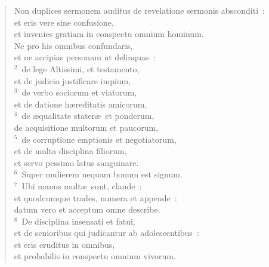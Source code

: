 \begin{flushleft}\begin{verse}\vspace{-19pt}\hspace{6pt}Non duplices sermonem auditus de revelatione sermonis absconditi~:\\\hspace{6pt} et eris vere sine confusione,\\ et invenies gratiam in conspectu omnium hominum.\\ Ne pro his omnibus confundaris,\\ et ne accipias personam ut delinquas~:\\
${}^{2}$~de lege Altissimi, et testamento,\\ et de judicio justificare impium,\\
${}^{3}$~de verbo sociorum et viatorum,\\ et de datione h\ae reditatis amicorum,\\
${}^{4}$~de \ae qualitate stater\ae\ et ponderum,\\ de acquisitione multorum et paucorum,\\
${}^{5}$~de corruptione emptionis et negotiatorum,\\ et de multa disciplina filiorum,\\ et servo pessimo latus sanguinare.\\
${}^{6}$~Super mulierem nequam bonum est signum.\\
${}^{7}$~Ubi manus mult\ae\ sunt, claude~:\\ et quodcumque trades, numera et appende~:\\ datum vero et acceptum omne describe.\\
${}^{8}$~De disciplina insensati et fatui,\\ et de senioribus qui judicantur ab adolescentibus~:\\ et eris eruditus in omnibus,\\ et probabilis in conspectu omnium vivorum.\end{verse}\end{flushleft}


